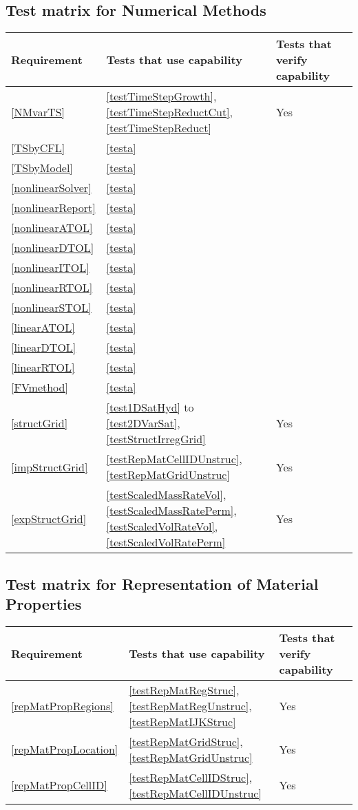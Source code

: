 \subsection{Test matrix for Numerical Methods}
\begin{tabular}{|l|l|l|l|}
	\hline
	Requirement & Tests that use capability & Tests that verify capability \\
	\hline
	\hline
		\ref{NMvarTS} & \ref{testTimeStepGrowth}, \ref{testTimeStepReductCut}, \ref{testTimeStepReduct} & Yes\\
	\hline
		\ref{TSbyCFL} & \ref{testa}& \\
	\hline
	\ref{TSbyModel} & \ref{testa} & \\
	\hline
	\ref{nonlinearSolver} & \ref{testa} &\\
	\hline
	\ref{nonlinearReport} & \ref{testa} &\\
	\hline
	\ref{nonlinearATOL} & \ref{testa} & \\
	\hline
	\ref{nonlinearDTOL} & \ref{testa} &\\
	\hline
	\ref{nonlinearITOL} & \ref{testa} &\\
	\hline
	\ref{nonlinearRTOL} & \ref{testa} &\\
	\hline
	\ref{nonlinearSTOL} & \ref{testa} & \\
	\hline
	\ref{linearATOL} & \ref{testa} &\\
	\hline
	\ref{linearDTOL} & \ref{testa} &\\
	\hline
	\ref{linearRTOL} & \ref{testa} &\\
	\hline
	\ref{FVmethod} & \ref{testa} &\\
	\hline
	\ref{structGrid} & \ref{test1DSatHyd} to \ref{test2DVarSat}, \ref{testStructIrregGrid} & Yes \\
	\hline
	\ref{impStructGrid} & \ref{testRepMatCellIDUnstruc}, \ref{testRepMatGridUnstruc} & Yes \\
	\hline
	\ref{expStructGrid} & \ref{testScaledMassRateVol}, \ref{testScaledMassRatePerm}, 
										\ref {testScaledVolRateVol}, \ref{testScaledVolRatePerm} & Yes\\
	\hline
\end{tabular}

\subsection{Test matrix for Representation of Material Properties}
\begin{tabular}{|l|l|l|l|}
	\hline
	Requirement & Tests that use capability & Tests that verify capability \\
	\hline
	\hline
	\ref{repMatPropRegions} & \ref{testRepMatRegStruc}, \ref{testRepMatRegUnstruc}, \ref{testRepMatIJKStruc}  & Yes\\
	\hline
	\ref{repMatPropLocation} & \ref{testRepMatGridStruc}, \ref{testRepMatGridUnstruc} & Yes \\
	\hline
	\ref{repMatPropCellID} & \ref{testRepMatCellIDStruc}, \ref{testRepMatCellIDUnstruc} & Yes \\
	\hline
\end{tabular}


